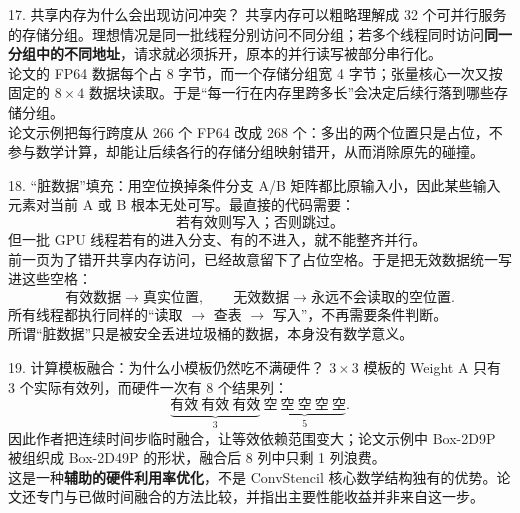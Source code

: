 \documentclass[aspectratio=169,11pt]{beamer}
\begin{document}
\begin{frame}{17. 共享内存为什么会出现访问冲突？}
\small
共享内存可以粗略理解成 32 个可并行服务的存储分组。理想情况是同一批线程分别访问不同分组；若多个线程同时访问\textbf{同一分组中的不同地址}，请求就必须拆开，原本的并行读写被部分串行化。\\[0.7em]
论文的 FP64 数据每个占 8 字节，而一个存储分组宽 4 字节；张量核心一次又按固定的 \(8\times4\) 数据块读取。于是“每一行在内存里跨多长”会决定后续行落到哪些存储分组。\\[0.7em]
论文示例把每行跨度从 266 个 FP64 改成 268 个：多出的两个位置只是占位，不参与数学计算，却能让后续各行的存储分组映射错开，从而消除原先的碰撞。
\end{frame}

\begin{frame}{18. “脏数据”填充：用空位换掉条件分支}
\small
A/B 矩阵都比原输入小，因此某些输入元素对当前 A 或 B 根本无处可写。最直接的代码需要：
\[
\text{若有效则写入；否则跳过。}
\]
但一批 GPU 线程若有的进入分支、有的不进入，就不能整齐并行。\\[0.7em]
前一页为了错开共享内存访问，已经故意留下了占位空格。于是把无效数据统一写进这些空格：
\[
\text{有效数据}\rightarrow\text{真实位置},\qquad
\text{无效数据}\rightarrow\text{永远不会读取的空位置}.
\]
所有线程都执行同样的“读取 \(\rightarrow\) 查表 \(\rightarrow\) 写入”，不再需要条件判断。\\[0.6em]
所谓“脏数据”只是被安全丢进垃圾桶的数据，本身没有数学意义。
\end{frame}

\begin{frame}{19. 计算模板融合：为什么小模板仍然吃不满硬件？}
\small
\(3\times3\) 模板的 Weight A 只有 3 个实际有效列，而硬件一次有 8 个结果列：
\[
\underbrace{\text{有效}\ \text{有效}\ \text{有效}}_{3}\ \underbrace{\text{空}\ \text{空}\ \text{空}\ \text{空}\ \text{空}}_{5}.
\]
因此作者把连续时间步临时融合，让等效依赖范围变大；论文示例中 Box-2D9P 被组织成 Box-2D49P 的形状，融合后 8 列中只剩 1 列浪费。\\[0.7em]
这是一种\textbf{辅助的硬件利用率优化}，不是 ConvStencil 核心数学结构独有的优势。论文还专门与已做时间融合的方法比较，并指出主要性能收益并非来自这一步。
\end{frame}
\end{document}
